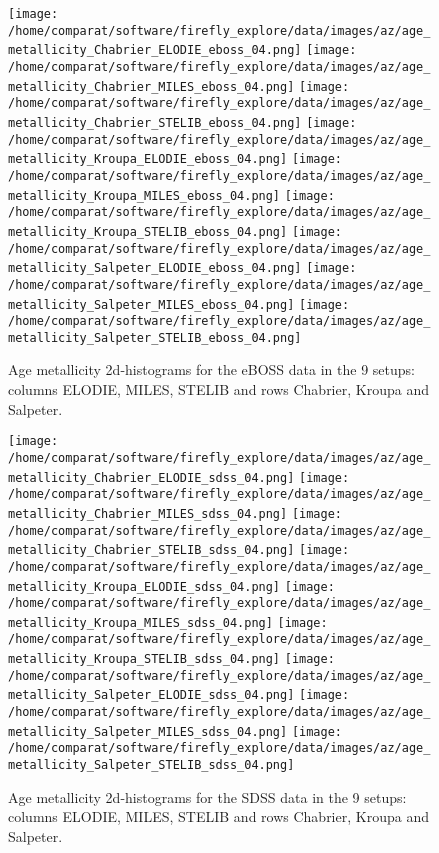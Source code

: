 \documentclass[onecolumn]{aa}
\begin{document}
\begin{figure}
\begin{center}
\caption{\label{fig:distributions:} 
Age metallicity 2d-histograms for the eBOSS data in the 9 setups: columns ELODIE, MILES, STELIB and rows Chabrier, Kroupa and Salpeter.}  
\texttt{[image: /home/comparat/software/firefly\_explore/data/images/az/age\_metallicity\_Chabrier\_ELODIE\_eboss\_04.png]}
\texttt{[image: /home/comparat/software/firefly\_explore/data/images/az/age\_metallicity\_Chabrier\_MILES\_eboss\_04.png]}
\texttt{[image: /home/comparat/software/firefly\_explore/data/images/az/age\_metallicity\_Chabrier\_STELIB\_eboss\_04.png]}
\texttt{[image: /home/comparat/software/firefly\_explore/data/images/az/age\_metallicity\_Kroupa\_ELODIE\_eboss\_04.png]}
\texttt{[image: /home/comparat/software/firefly\_explore/data/images/az/age\_metallicity\_Kroupa\_MILES\_eboss\_04.png]}
\texttt{[image: /home/comparat/software/firefly\_explore/data/images/az/age\_metallicity\_Kroupa\_STELIB\_eboss\_04.png]}
\texttt{[image: /home/comparat/software/firefly\_explore/data/images/az/age\_metallicity\_Salpeter\_ELODIE\_eboss\_04.png]}
\texttt{[image: /home/comparat/software/firefly\_explore/data/images/az/age\_metallicity\_Salpeter\_MILES\_eboss\_04.png]}
\texttt{[image: /home/comparat/software/firefly\_explore/data/images/az/age\_metallicity\_Salpeter\_STELIB\_eboss\_04.png]}
\end{center}
\end{figure}

\begin{figure}
\begin{center}
\caption{\label{fig:distributions:} 
Age metallicity 2d-histograms for the SDSS data in the 9 setups: columns ELODIE, MILES, STELIB and rows Chabrier, Kroupa and Salpeter.}  
\texttt{[image: /home/comparat/software/firefly\_explore/data/images/az/age\_metallicity\_Chabrier\_ELODIE\_sdss\_04.png]}
\texttt{[image: /home/comparat/software/firefly\_explore/data/images/az/age\_metallicity\_Chabrier\_MILES\_sdss\_04.png]}
\texttt{[image: /home/comparat/software/firefly\_explore/data/images/az/age\_metallicity\_Chabrier\_STELIB\_sdss\_04.png]}
\texttt{[image: /home/comparat/software/firefly\_explore/data/images/az/age\_metallicity\_Kroupa\_ELODIE\_sdss\_04.png]}
\texttt{[image: /home/comparat/software/firefly\_explore/data/images/az/age\_metallicity\_Kroupa\_MILES\_sdss\_04.png]}
\texttt{[image: /home/comparat/software/firefly\_explore/data/images/az/age\_metallicity\_Kroupa\_STELIB\_sdss\_04.png]}
\texttt{[image: /home/comparat/software/firefly\_explore/data/images/az/age\_metallicity\_Salpeter\_ELODIE\_sdss\_04.png]}
\texttt{[image: /home/comparat/software/firefly\_explore/data/images/az/age\_metallicity\_Salpeter\_MILES\_sdss\_04.png]}
\texttt{[image: /home/comparat/software/firefly\_explore/data/images/az/age\_metallicity\_Salpeter\_STELIB\_sdss\_04.png]}
\end{center}
\end{figure}
\end{document}
